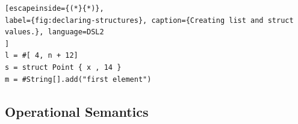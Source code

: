 \begin{lstlisting}[escapeinside={(*}{*)}, 
label={fig:declaring-structures}, caption={Creating list and struct values.}, language=DSL2
]
l = #[ 4, n + 12]
s = struct Point { x , 14 }
m = #String[].add("first element")
\end{lstlisting}




\ifoperationalSemanticsOn
\subsection{Operational Semantics} \label{sec:operational-semantic}



